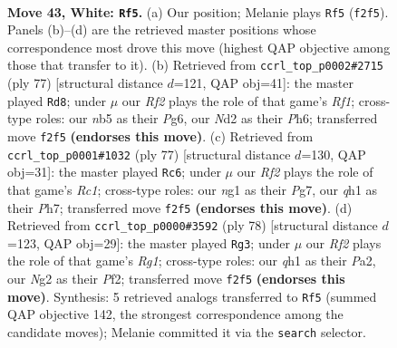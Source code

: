 \documentclass[11pt]{article}
\begin{document}
\clearpage

\begin{figure}[p]\centering
\begin{subfigure}{0.46\textwidth}\centering
\resizebox{\linewidth}{!}{%
\newchessgame
\chessboard[
  setfen={1r3bk1/1r3p2/2Q5/1n2p3/R3P3/3KB3/3N1RN1/6nq w - - 10 43},
  showmover=false,
  pgfstyle=straightmove, color=movearrow, markmove={f2-f5}
]}
\caption{}
\end{subfigure}\hfill
\begin{subfigure}{0.46\textwidth}\centering
\resizebox{\linewidth}{!}{%
\newchessgame
\chessboard[
  setfen={5r2/6bk/6pp/2Rn4/7P/3r2P1/5PK1/2B2RN1 b - - 2 39},
  showmover=false,
  pgfstyle=straightmove, color=movearrow, markmove={f8-d8}
]}
\caption{}
\end{subfigure}
\\[4pt]
\begin{subfigure}{0.46\textwidth}\centering
\resizebox{\linewidth}{!}{%
\newchessgame
\chessboard[
  setfen={2r1nk2/3b1ppp/1p1p4/8/2P2P2/5P2/7P/1RR1B2K b - - 3 39},
  showmover=false,
  pgfstyle=straightmove, color=movearrow, markmove={c8-c6}
]}
\caption{}
\end{subfigure}\hfill
\begin{subfigure}{0.46\textwidth}\centering
\resizebox{\linewidth}{!}{%
\newchessgame
\chessboard[
  setfen={3r4/6k1/2bnr1p1/p3p2R/2P5/2K1B3/P2N1P2/6R1 w - - 0 40},
  showmover=false,
  pgfstyle=straightmove, color=movearrow, markmove={g1-g3}
]}
\caption{}
\end{subfigure}
\caption{\textbf{Move 43, White: \texttt{Rf5}.} (a) Our position; Melanie plays \texttt{Rf5} (\texttt{f2f5}). Panels (b)--(d) are the retrieved master positions whose correspondence most drove this move (highest QAP objective among those that transfer to it). (b) Retrieved from \texttt{ccrl\_top\_p0002\#2715} (ply 77) [structural distance $d$=121, QAP obj=41]: the master played \texttt{Rd8}; under $\mu$ our \emph{Rf2} plays the role of that game's \emph{Rf1}; cross-type roles: our \emph{n}b5 as their \emph{P}g6, our \emph{N}d2 as their \emph{P}h6; transferred move \texttt{f2f5} \textbf{(endorses this move)}. (c) Retrieved from \texttt{ccrl\_top\_p0001\#1032} (ply 77) [structural distance $d$=130, QAP obj=31]: the master played \texttt{Rc6}; under $\mu$ our \emph{Rf2} plays the role of that game's \emph{Rc1}; cross-type roles: our \emph{n}g1 as their \emph{P}g7, our \emph{q}h1 as their \emph{P}h7; transferred move \texttt{f2f5} \textbf{(endorses this move)}. (d) Retrieved from \texttt{ccrl\_top\_p0000\#3592} (ply 78) [structural distance $d$=123, QAP obj=29]: the master played \texttt{Rg3}; under $\mu$ our \emph{Rf2} plays the role of that game's \emph{Rg1}; cross-type roles: our \emph{q}h1 as their \emph{P}a2, our \emph{N}g2 as their \emph{P}f2; transferred move \texttt{f2f5} \textbf{(endorses this move)}. Synthesis: 5 retrieved analogs transferred to \texttt{Rf5} (summed QAP objective 142, the strongest correspondence among the candidate moves); Melanie committed it via the \texttt{search} selector.}
\label{fig:thought-m84}
\end{figure}
\end{document}
